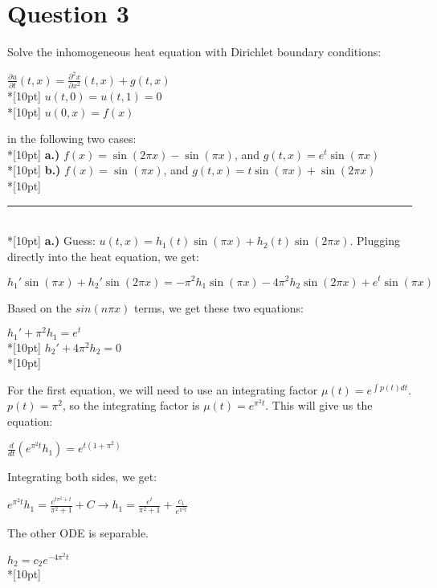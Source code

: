 \documentclass{article}
\begin{document}
\section{Question 3}
Solve the inhomogeneous heat equation with Dirichlet boundary conditions:
\begin{center}
    \(\displaystyle \frac{\partial u}{\partial t}(t, x) = \frac{\partial^2 x}{\partial x^2}(t, x) + g(t, x)\)\\*[10pt]
    \(u(t, 0) = u(t, 1) = 0\)\\*[10pt]
    \(u(0, x) = f(x)\)
\end{center}
in the following two cases:\\*[10pt]
\textbf{a.)} \(f(x) = \sin (2\pi x) - \sin (\pi x)\), and \(g(t, x) = e^t\sin(\pi x)\)\\*[10pt]
\textbf{b.)} \(f(x) = \sin (\pi x)\), and \(g(t, x) = t\sin (\pi x) + \sin (2\pi x)\)\\*[10pt]    
\rule{\linewidth}{0.2mm}\\*[10pt]
\textbf{a.)} Guess: \(u(t, x) = h_1(t)\sin(\pi x) + h_2(t)\sin(2\pi x)\). Plugging directly into the heat equation, we get:
\begin{center}
    \(\displaystyle h_1'\sin(\pi x) + h_2'\sin(2\pi x) = -\pi^2h_1\sin(\pi x) -4\pi^2h_2\sin(2\pi x) + e^t\sin(\pi x)\)
\end{center}
Based on the \(sin(n\pi x)\) terms, we get these two equations:
\begin{center}
    \(h_1' + \pi^2h_1 = e^t\)\\*[10pt]
    \(h_2' + 4\pi^2h_2 = 0\)\\*[10pt]
\end{center}
For the first equation, we will need to use an integrating factor \(\displaystyle \mu(t) = e^{\int p(t)dt}\). \(p(t) = \pi^2\), so the integrating factor is \(\mu(t) = e^{\pi^2t}\). This will give us the equation:
\begin{center}
    \(\displaystyle\frac{d}{dt}(e^{\pi^2t}h_1) = e^{t(1+\pi^2)}\)
\end{center}
Integrating both sides, we get:
\begin{center}
    \(\displaystyle e^{\pi^2t}h_1 = \frac{e^{t\pi^2+t}}{\pi^2+1}+C\rightarrow h_1 = \frac{e^t}{\pi^2 + 1} + \frac{c_1}{e^{\pi^2t}}\)
\end{center}
The other ODE is separable.
\begin{center}
    \(h_2=c_2e^{-4\pi^2t}\)\\*[10pt]
\end{center}
\end{document}
